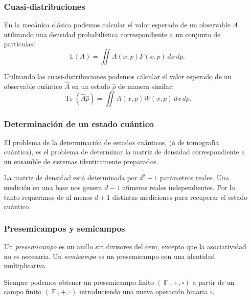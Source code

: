 \documentclass[10pt,spanish]{beamer}
\DeclareMathOperator{\F}{\mathbb{F}}
\DeclareMathOperator{\Tr}{Tr}
\begin{document}
  \begin{frame}
    \frametitle{Cuasi-distribuciones}

    En la mecánica clásica podemos calcular el valor
    esperado de un observable $A$ utilizando una densidad
    probabilística correspondiente a un conjunto de
    partículas:
    \begin{equation}
      \mathbb E(A)
      = \iint A(x,p) F(x,p) \, dx \, dp.
    \end{equation}

    \vspace{10pt}

    Utilizando las cuasi-distribuciones podemos cálcular el
    valor esperado de un observable cuántico $\hat A$ en un
    estado $\hat \rho$ de manera similar:
    \begin{equation}
      \Tr\left( \hat A \hat \rho \right)
      = \iint A(x,p) W(x,p) \, dx \, dp.
    \end{equation}
  \end{frame}

  \begin{frame}
    \frametitle{Determinación de un estado cuántico}
    
    El problema de la determinación de estados cuánticos, (ó
    de tomografía cuántica), es el problema de determinar la
    matriz de densidad correspondiente a un ensamble de
    sistemas identicamente preparados.

    \vspace{15pt}

    La matriz de densidad está determinada por $d^2 - 1$
    parámetros reales. Una medición en una base nos genera
    $d-1$ números reales independientes. Por lo tanto
    requerimos de al menos $d+1$ distintas mediciones para
    recuperar el estado cuántico.
  \end{frame}

  \begin{frame}
    \frametitle{Presemicampos y semicampos}

    \begin{definition}
      Un \textit{presemicampo} es un anillo sin divisores
      del cero, excepto que la asociatividad no es
      necesaria. Un \textit{semicampo} es un presemicampo
      con una identidad multiplicativa.
    \end{definition}

    \vspace{5pt}

    Siempre podemos obtener un presemicampo finito $(\F,
    +,\circ)$ a partir de un campo finito $(\F,+,\cdot)$
    introduciendo una nueva operación binaria $\circ$.
  \end{frame}
\end{document}
